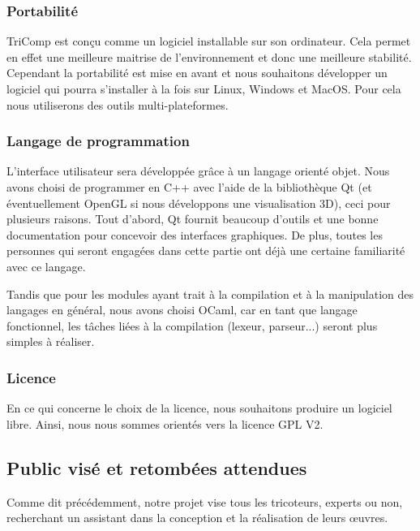\documentclass{article}
\begin{document}
\subsubsection{Portabilité}

TriComp est conçu comme un logiciel installable sur son ordinateur. Cela permet en effet une meilleure maitrise de l'environnement et donc 
une meilleure stabilité. Cependant la portabilité est mise en avant et nous souhaitons développer un logiciel qui pourra s'installer à la 
fois sur Linux, Windows et MacOS. Pour cela nous utiliserons des outils multi-plateformes. 

\subsubsection{Langage de programmation}

L'interface utilisateur sera développée grâce à un langage orienté objet. Nous avons choisi de programmer en C++ avec l'aide de la 
bibliothèque Qt (et éventuellement OpenGL si nous développons une visualisation 3D), ceci pour plusieurs raisons. Tout d'abord, Qt fournit 
beaucoup d'outils et une bonne documentation pour concevoir des interfaces graphiques. De plus, toutes les personnes qui seront engagées 
dans cette partie ont déjà une certaine familiarité avec ce langage. 

Tandis que pour les modules ayant trait à la compilation et à la manipulation des langages en général, nous avons choisi OCaml, car en 
tant que langage fonctionnel, les tâches liées à la compilation (lexeur, parseur...) seront plus simples à réaliser. 


\subsubsection{Licence}

En ce qui concerne le choix de la licence, nous souhaitons produire un logiciel libre. Ainsi, nous nous sommes orientés vers la licence 
GPL V2. %

\subsection{Public visé et retombées attendues}

Comme dit précédemment, notre projet vise tous les tricoteurs, experts ou non, recherchant un assistant dans la conception et la
réalisation de leurs \oe{}uvres.
\end{document}

